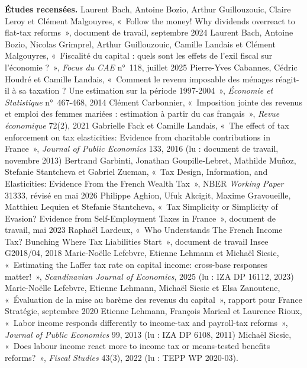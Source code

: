 \documentclass[11pt,a4paper]{article}
\begin{document}
{\small
\textbf{Études recensées.} Laurent Bach, Antoine Bozio, Arthur Guillouzouic, Claire Leroy et Clément
Malgouyres, «~Follow the money! Why dividends overreact to flat-tax reforms~», document de travail,
septembre 2024 \textbullet{} Laurent Bach, Antoine Bozio, Nicolas Grimprel, Arthur Guillouzouic,
Camille Landais et Clément Malgouyres, «~Fiscalité du capital : quels sont les effets de l'exil
fiscal sur l'économie ?~», \emph{Focus du CAE} n°~118, juillet 2025 \textbullet{} Pierre-Yves
Cabannes, Cédric Houdré et Camille Landais, «~Comment le revenu imposable des ménages réagit-il à sa
taxation ? Une estimation sur la période 1997-2004~», \emph{Économie et Statistique} n°~467-468,
2014 \textbullet{} Clément Carbonnier, «~Imposition jointe des revenus et emploi des femmes mariées :
estimation à partir du cas français~», \emph{Revue économique} 72(2), 2021 \textbullet{} Gabrielle
Fack et Camille Landais, «~The effect of tax enforcement on tax elasticities: Evidence from
charitable contributions in France~», \emph{Journal of Public Economics} 133, 2016 (lu : document de
travail, novembre 2013) \textbullet{} Bertrand Garbinti, Jonathan Goupille-Lebret, Mathilde Muñoz,
Stefanie Stantcheva et Gabriel Zucman, «~Tax Design, Information, and Elasticities: Evidence From
the French Wealth Tax~», NBER \emph{Working Paper} 31333, révisé en mai 2026 \textbullet{} Philippe
Aghion, Ufuk Akcigit, Maxime Gravoueille, Matthieu Lequien et Stefanie Stantcheva, «~Tax Simplicity
or Simplicity of Evasion? Evidence from Self-Employment Taxes in France~», document de travail, mai
2023 \textbullet{} Raphaël Lardeux, «~Who Understands The French Income Tax? Bunching Where Tax
Liabilities Start~», document de travail Insee G2018/04, 2018 \textbullet{} Marie-Noëlle Lefebvre,
Etienne Lehmann et Michaël Sicsic, «~Estimating the Laffer tax rate on capital income: cross-base
responses matter!~», \emph{Scandinavian Journal of Economics}, 2025 (lu : IZA DP 16112, 2023)
\textbullet{} Marie-Noëlle Lefebvre, Etienne Lehmann, Michaël Sicsic et Elsa Zanoutene, «~Évaluation
de la mise au barème des revenus du capital~», rapport pour France Stratégie, septembre 2020
\textbullet{} Etienne Lehmann, François Marical et Laurence Rioux, «~Labor income responds
differently to income-tax and payroll-tax reforms~», \emph{Journal of Public Economics} 99, 2013
(lu : IZA DP 6108, 2011) \textbullet{} Michaël Sicsic, «~Does labour income react more to income tax
or means-tested benefits reforms?~», \emph{Fiscal Studies} 43(3), 2022 (lu : TEPP WP 2020-03).

}
\end{document}
